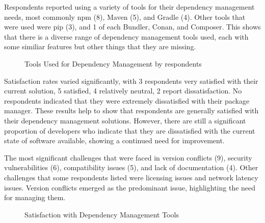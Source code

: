 \documentclass[sigconf]{acmart}
\begin{document}
Respondents reported using a variety of tools for their dependency management needs, most commonly npm (8), Maven (5), and Gradle (4). Other tools that were used were pip (3), and 1 of each Bundler, Conan, and Composer. This shows that there is a diverse range of dependency management tools used, each with some similiar features but other things that they are missing.

\begin{figure}[ht]
	\centering
	\caption{Tools Used for Dependency Management by respondents}
	\label{fig:tools}
\end{figure}

Satisfaction rates varied significantly, with 3 respondents very satisfied with their current solution, 5 satisfied, 4 relatively neutral, 2 report dissatisfaction. No respondents indicated that they were extremely dissatisfied with their package manager. These results help to show that respondents are generally satisfied with their dependency management solutions. However, there are still a significant proportion of developers who indicate that they are dissatisfied with the current state of software available, showing a continued need for improvement.

The most significant challenges that were faced in version conflicts (9), security vulnerabilities (6), compatibility issues (5), and lack of documentation (4). Other challenges that some respondents listed were licensing issues and network latency issues. Version conflicts emerged as the predominant issue, highlighting the need for managing them.

\begin{figure}[ht]
	\centering
	\caption{Satisfaction with Dependency Management Tools}
	\label{fig:satisfaction}
\end{figure}
\end{document}
